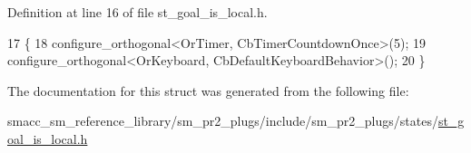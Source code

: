Definition at line 16 of file st\+\_\+goal\+\_\+is\+\_\+local.\+h.


\begin{DoxyCode}
17     \{
18         configure\_orthogonal<OrTimer,  CbTimerCountdownOnce>(5);    
19         configure\_orthogonal<OrKeyboard, CbDefaultKeyboardBehavior>();
20     \}
\end{DoxyCode}


The documentation for this struct was generated from the following file\+:\begin{DoxyCompactItemize}
\item 
smacc\+\_\+sm\+\_\+reference\+\_\+library/sm\+\_\+pr2\+\_\+plugs/include/sm\+\_\+pr2\+\_\+plugs/states/\hyperlink{st__goal__is__local_8h}{st\+\_\+goal\+\_\+is\+\_\+local.\+h}\end{DoxyCompactItemize}
